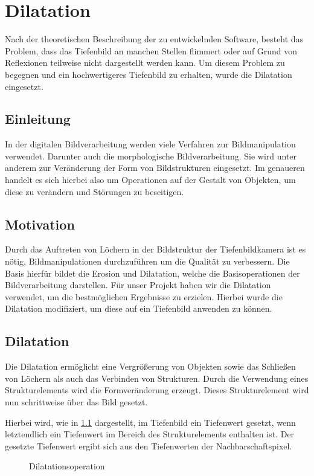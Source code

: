 
\chapter{Dilatation}
\label{chap:dilat}

Nach der theoretischen Beschreibung der zu entwickelnden Software, besteht das Problem, dass das Tiefenbild an manchen Stellen flimmert oder auf Grund von Reflexionen teilweise nicht dargestellt werden kann.
Um diesem Problem zu begegnen und ein hochwertigeres Tiefenbild zu erhalten, wurde die Dilatation eingesetzt.

\section{Einleitung}
In der digitalen Bildverarbeitung werden viele Verfahren zur Bildmanipulation verwendet.
Darunter auch die morphologische Bildverarbeitung.
Sie wird unter anderem zur Veränderung der Form von Bildstrukturen eingesetzt.
Im genaueren handelt es sich hierbei also um Operationen auf der Gestalt von Objekten, um diese zu verändern und Störungen zu beseitigen.

\section{Motivation}
Durch das Auftreten von Löchern in der Bildstruktur der Tiefenbildkamera ist es nötig, Bildmanipulationen durchzuführen um die Qualität zu verbessern.
Die Basis hierfür bildet die Erosion und Dilatation, welche die Basisoperationen der Bildverarbeitung darstellen.
Für unser Projekt haben wir die Dilatation verwendet, um die bestmöglichen Ergebnisse zu erzielen.
Hierbei wurde die Dilatation modifiziert, um diese auf ein Tiefenbild anwenden zu können.

\section{Dilatation}
Die Dilatation ermöglicht eine Vergrößerung von Objekten sowie das Schließen von Löchern als auch das Verbinden von Strukturen.
Durch die Verwendung eines Strukturelements wird die Formveränderung erzeugt.
Dieses Strukturelement wird nun schrittweise über das Bild gesetzt.

Hierbei wird, wie in \cref{fig:dilat_dilat} dargestellt, im Tiefenbild ein Tiefenwert gesetzt, wenn letztendlich ein Tiefenwert im Bereich des Strukturelements enthalten ist.
Der gesetzte Tiefenwert ergibt sich aus den Tiefenwerten der Nachbarschaftspixel.
\begin{figure}[H]
	\centering
	\caption{Dilatationsoperation}
	\label{fig:dilat_dilat}
\end{figure}

